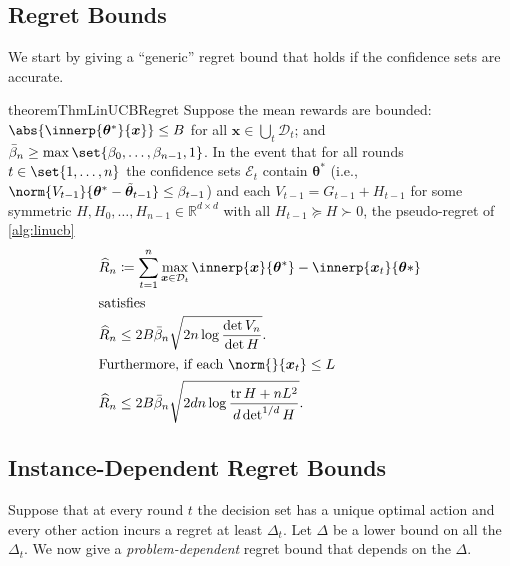\documentclass{article}
\renewcommand{\vec}[1]{\bm{#1}}
\newcommand{\defeq}{\coloneq}
\newcommand{\Real}{\mathds{R}}
\DeclareMathOperator{\tr}{tr}
\DeclarePairedDelimiter{\abs}||
\newcommand{\Dset}[1]{\mathcal{D}_{#1}}
\newcommand{\Eset}[1]{\mathcal{E}_{#1}}
\begin{document}
\subsection{Regret Bounds}
\label{sec:regret-bounds}

We start by giving a ``generic'' regret bound
that holds if the confidence sets are accurate.

\begin{restatable}{theorem}{ThmLinUCBRegret}
  \label{thm:linucb-regret}%
  Suppose the mean rewards are bounded:
  $\abs{\innerp{\vec\theta^*}{\vec x}} \le B$ for all $\vec x \in \bigcup_t\Dset{t}$;
  and $\bar\beta_n \ge \max\set{\beta_0,\dotsc,\beta_{n-1},1}$.  In
  the event that for all rounds $t\in\set{1,\dotsc,n}$ the confidence
  sets $\Eset{t}$ contain $\vec\theta^*$ (i.e.,
  $\norm{V_{t-1}}{\vec\theta^* - \tilde{\vec\theta}_{t-1}} \le
  \beta_{t-1}$) and each $V_{t-1} = G_{t-1} + H_{t-1}$ for some
  symmetric $H,H_0,\dotsc,H_{n-1} \in \Real^{d\times d}$ with all
  $H_{t-1} \succeq H \succ 0$, the pseudo-regret of \cref{alg:linucb}
  \begin{align*}
    \widehat R_n
    &\defeq \sum_{t=1}^n \max_{\vec x\in\Dset{t}} \innerp{\vec x}{\vec\theta^*}
      - \innerp{\vec x_t}{\vec\theta*} \\
    \shortintertext{satisfies}
    \widehat R_n
    &\le 2B\bar\beta_n \sqrt{2n \log\frac{\det V_n}{\det H}}. \\
    \shortintertext{Furthermore, if each $\norm{}{\vec x_t} \le L$}
    \widehat R_n
    &\le 2B\bar\beta_n \sqrt{2dn \log\frac{\tr H + nL^2}{d\det^{1/d} H}}.
  \end{align*}
\end{restatable}

\subsection{Instance-Dependent Regret Bounds}%
\label{sec:prob-dep-regret}


\begin{theorem}
  Suppose that at every round $t$ the decision set has a unique optimal
  action and every other action incurs a regret at least $\Delta_t$.
  Let $\Delta$ be a lower bound on all the $\Delta_t$.  We now give a
  \emph{problem-dependent} regret bound that depends on the $\Delta$.
\end{theorem}
\end{document}
